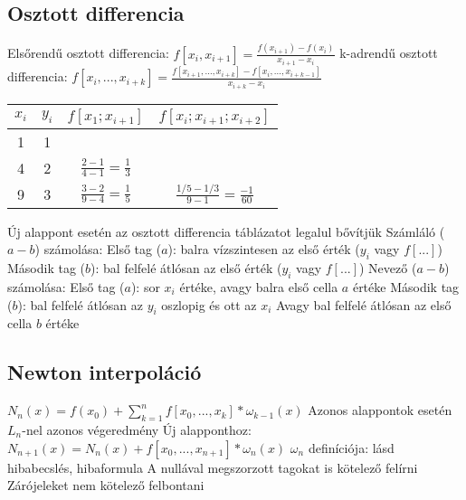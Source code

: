 \documentclass[12pt,a4paper]{article}
\begin{document}
\pagebreak

\subsection{Osztott differencia}

\begin{outline}
	\1 Elsőrendű osztott differencia: $f[x_i,x_{i+1}] = \frac{f(x_{i+1})-f(x_i)}{x_{i+1} - x_i}$
	\1 k-adrendű osztott differencia:
	$f[x_i,...,x_{i+k}] = \frac{f[x_{i+1},...,x_{i+k}] - f[x_i,...,x_{i+k-1}]}{x_{i+k} - x_i}$
\end{outline}

\begin{table}[h!]
	\centering
	\begin{tabular}{|c|c|c|c|}
		\hline
		$x_i$ & $y_i$ & $f[x_1;x_{i+1}]$ & $f[x_i;x_{i+1};x_{i+2}]$ \\
		\hline
		1 & 1 & & \\
		\hline
		4 & 2 & $\frac{2-1}{4-1} = \frac{1}{3}$ & \\
		\hline
		9 & 3 & $\frac{3-2}{9-4} = \frac{1}{5}$ & $\frac{1/5 - 1/3}{9 - 1} = \frac{-1}{60}$ \\
		\hline
	\end{tabular}
\end{table}

\begin{outline}
	\1 Új alappont esetén az osztott differencia táblázatot legalul bővítjük
	\1 Számláló ($a-b$) számolása:
		\2 Első tag ($a$): balra vízszintesen az első érték ($y_i$ vagy $f[...]$)
		\2 Második tag ($b$): bal felfelé átlósan az első érték ($y_i$ vagy $f[...]$)
	\1 Nevező ($a-b$) számolása:
		\2 Első tag ($a$): sor $x_i$ értéke, avagy balra első cella $a$ értéke
		\2 Második tag ($b$): bal felfelé átlósan az $y_i$ oszlopig és ott az $x_i$
			\3 Avagy bal felfelé átlósan az első cella $b$ értéke
\end{outline}

\subsection{Newton interpoláció}

\begin{outline}
	\1 $N_n(x) = f(x_0) + \sum_{k=1}^n f[x_0,...,x_k] * \omega_{k-1}(x)$
		\2 Azonos alappontok esetén $L_n$-nel azonos végeredmény
		\2 Új alapponthoz: $N_{n+1}(x) = N_n(x) + f[x_0,...,x_{n+1}] * \omega_{n}(x)$
		\2 $\omega_n$ definíciója: lásd hibabecslés, hibaformula
	\1 A nullával megszorzott tagokat is kötelező felírni
	\1 Zárójeleket nem kötelező felbontani
\end{outline}
\end{document}
